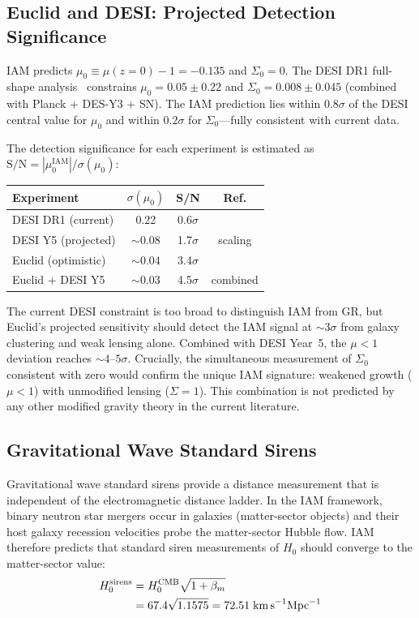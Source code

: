 \documentclass[aps,prd,twocolumn,superscriptaddress,nofootinbib]{revtex4-2}
\begin{document}
\subsection{Euclid and DESI: Projected Detection Significance}

IAM predicts $\mu_0 \equiv \mu(z=0) - 1 = -0.135$ and $\Sigma_0 = 0$. The DESI DR1 full-shape analysis~\cite{DESIDR1FS} constrains $\mu_0 = 0.05 \pm 0.22$ and $\Sigma_0 = 0.008 \pm 0.045$ (combined with Planck + DES-Y3 + SN). The IAM prediction lies within $0.8\sigma$ of the DESI central value for $\mu_0$ and within $0.2\sigma$ for $\Sigma_0$---fully consistent with current data.

The detection significance for each experiment is estimated as $\text{S/N} = |\mu_0^\text{IAM}|/\sigma(\mu_0)$:
\begin{center}
{\small
\begin{tabular}{@{}lccc@{}}
\hline
Experiment & $\sigma(\mu_0)$ & S/N & Ref. \\
\hline
DESI DR1 (current) & 0.22 & 0.6$\sigma$ & \cite{DESIDR1FS} \\
DESI Y5 (projected) & ${\sim}0.08$ & 1.7$\sigma$ & scaling \\
Euclid (optimistic) & ${\sim}0.04$ & 3.4$\sigma$ & \cite{EuclidForecast2024} \\
Euclid + DESI Y5 & ${\sim}0.03$ & 4.5$\sigma$ & combined \\
\hline
\end{tabular}}
\end{center}

The current DESI constraint is too broad to distinguish IAM from GR, but Euclid's projected sensitivity should detect the IAM signal at $\sim$3$\sigma$ from galaxy clustering and weak lensing alone. Combined with DESI Year~5, the $\mu < 1$ deviation reaches $\sim$$4$--$5\sigma$. Crucially, the simultaneous measurement of $\Sigma_0$ consistent with zero would confirm the unique IAM signature: weakened growth ($\mu < 1$) with unmodified lensing ($\Sigma = 1$). This combination is not predicted by any other modified gravity theory in the current literature.

\subsection{Gravitational Wave Standard Sirens}

Gravitational wave standard sirens provide a distance measurement that is independent of the electromagnetic distance ladder. In the IAM framework, binary neutron star mergers occur in galaxies (matter-sector objects) and their host galaxy recession velocities probe the matter-sector Hubble flow. IAM therefore predicts that standard siren measurements of $H_0$ should converge to the matter-sector value:
\begin{align}
H_0^\text{sirens} &= H_0^\text{CMB}\sqrt{1 + \beta_m} \nonumber \\
&= 67.4\sqrt{1.1575} = 72.51 \;\text{km\,s}^{-1}\text{Mpc}^{-1}
\end{align}
\end{document}
